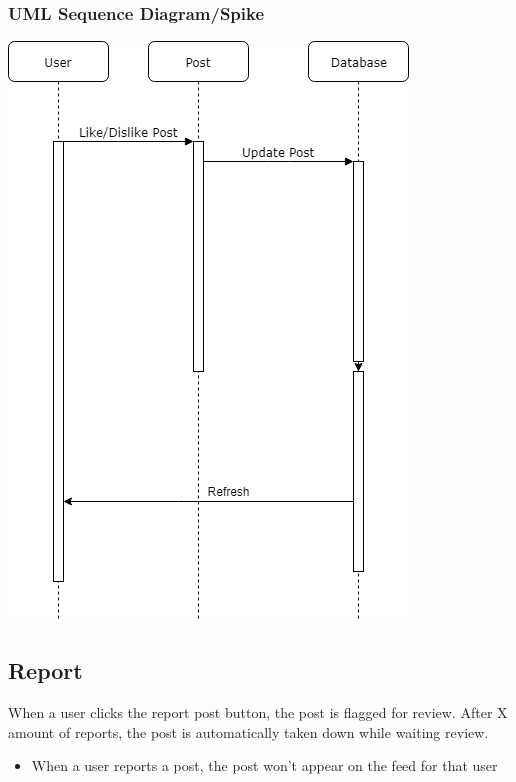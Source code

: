 \documentclass[12pt]{article}
\begin{document}
\subsubsection{UML Sequence Diagram/Spike}
\includegraphics[scale=0.5]{img/3.png}\linebreak

\subsection{Report}
When a user clicks the report post button, the post is flagged for review. After
X amount of reports, the post is automatically taken down while waiting review.
\begin{itemize}
  \item When a user reports a post, the post won’t appear on the feed for that user
\end{itemize}
\end{document}
